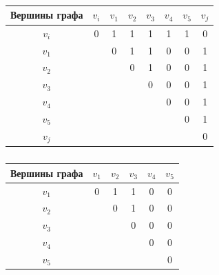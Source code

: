 \begin{table}[h]

\centering 



\begin{minipage}{85mm}

\small \centering 

\caption{} \vspace{-3mm}

\begin{tabular}{c|c|c|c|c|c|c|c} \hline

\footnotesize Вершины графа& $v_i $&$v_1 $&$v_2 $&$v_3 $&$v_4 $&$v_5 $&$v_j $ \\ \hline

\rule{0mm}{12pt}%

$v_i $&0&1&1&1&1&1&0 \\

$v_1 $&&0&1&1&0&0&1 \\ 

$v_2 $&&&0&1&0&0&1 \\ 

$v_3 $&&&&0&0&0&1 \\ 

$v_4 $&&&&&0&0&1 \\ 

$v_5 $&&&&&&0&1 \\ 

$v_j $&&&&&&&0 \\ \hline

\end{tabular}

\end{minipage}

\end{table}



\begin{table}

\centering \small

\caption{}\vspace{-3mm}

\begin{tabular}{c|c|c|c|c|c}

\hline

\footnotesize Вершины графа &$v_1 $&$v_2 $&$v_3 $&$v_4 $&$v_5 $ \\ \hline

\rule{0mm}{12pt}%

$v_1 $&0&1&1&0&0 \\ 

$v_2 $&&0&1&0&0 \\ 

$v_3 $&&&0&0&0 \\ 

$v_4 $&&&&0&0 \\ 

$v_5 $&&&&&0 \\ \hline

\end{tabular}

\end{table}



